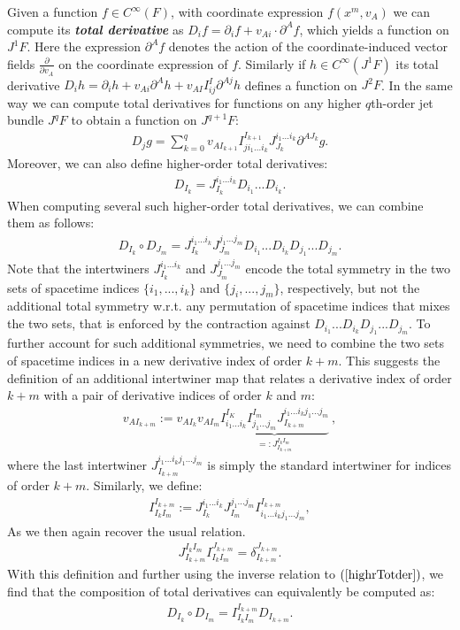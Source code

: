 Given a function $f \in C^{\infty}(F)$, with coordinate expression $f(x^m, v_A)$ we can compute its \textit{\textbf{total derivative}} as $D_if = \partial_i f + v_{Ai}\cdot \partial^A f$, which yields a function on $J^1F$. Here the expression $\partial^A f$ denotes the action of the coordinate-induced vector fields $\frac{\partial}{\partial v_A}$ on the coordinate expression of $f$. Similarly if $h \in C^{\infty}(J^1F)$ its total derivative $D_i h = \partial_i h + v_{Ai} \partial^A h + v_{AI}I^I_{ij} \partial ^{Aj} h$ defines a function on $J^2F$. In the same way we can compute total derivatives for functions on any higher $q$th-order jet bundle $J^qF$ to obtain a function on $J^{q+1}F$:
\begin{align}\label{totDer}
    D_j g = \sum _{k = 0}^{q}  v_{AI_{k+1}}I^{I_{k+1}}_{ji_1...i_k}J_{J_k}^{i_1...i_k}\partial^{AJ_k} g.
\end{align}
Moreover, we can also define higher-order total derivatives:
\begin{align}\label{highrTotder}
    D_{I_k} = J_{I_k}^{i_1...i_k}D_{i_1} ...  D_{i_k}.
\end{align}
When computing several such higher-order total derivatives, we can combine them as follows:
\begin{align}
D_{I_k} \circ D_{J_m} = J_{I_k}^{i_1...i_k}J_{J_m}^{j_1...j_m}D_{i_1}  ...  D_{i_k}  D_{j_1}  ...  D_{j_m}.
\end{align}
Note that the intertwiners $J_{I_k}^{i_1...i_k}$ and $J_{J_m}^{j_1...j_m}$ encode the total symmetry in the two sets of spacetime indices $\{i_1,...,i_k\}$ and $\{j_i,...,j_m\}$, respectively, but not the additional total symmetry w.r.t. any permutation of spacetime indices that mixes the two sets, that is enforced by the contraction against $D_{i_1}  ...  D_{i_k}  D_{j_1}  ...  D_{j_m}$.
To further account for such additional symmetries, we need to combine the two sets of spacetime indices in a new derivative index of order $k+m$. This suggests the definition of an additional intertwiner map that relates a derivative index of order $k+m$ with a pair of derivative indices of order $k$ and $m$:
\begin{align}
   v_{AI_{k+m}} := v_{AI_k} v_{AI_m}
   \underbrace{I^{I_K}_{i_1...i_k}I^{I_m}_{j_1...j_m}J^{i_1...i_k j_1...j_m}_{I_{k+m}}}_{=: J^{I_k I_m}_{I_{k+m}}}  \   ,
\end{align}
where the last intertwiner $J^{i_1...i_k j_1...j_m}_{I_{k+m}}$ is simply the standard intertwiner for indices of order $k+m$.
Similarly, we define:
\begin{align}
    I^{I_{k+m}}_{I_k I_m} := J_{I_k}^{i_1...i_k}J_{I_m}^{j_1...j_m}I^{I_{k+m} }_{i_1...i_k j_1...j_m},
\end{align}
As we then again recover the usual relation. \begin{align}
J^{I_kI_m}_{I_{k+m}} I^{J_{k+m}}_{I_k I_m} = \delta^{J_{k+m}}_{I_{k+m}}.
\end{align}
With this definition and further using the inverse relation to $(\ref{highrTotder})$, we find that the composition of total derivatives can equivalently be computed as:
\begin{align}
   D_{I_k} \circ D_{I_m} =  I^{I_{k+m} }_{I_k I_m} D_{I_{k+m}}.
\end{align}
 

